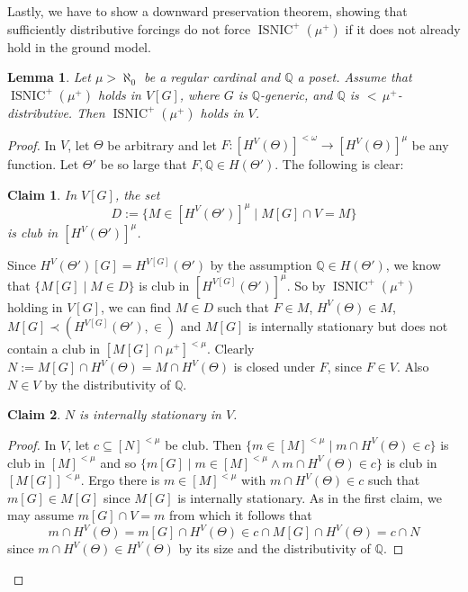 \documentclass[12pt]{amsart}
\theoremstyle{definition}
\theoremstyle{remark}
\theoremstyle{plain}
\newtheorem{mylem}[mydef]{Lemma}
\newtheorem{myclaim}{Claim}
\numberwithin{mydef}{section}
\DeclareMathOperator{\ISNIC}{ISNIC}
\newcommand{\dQ}{\mathbb{Q}}
\begin{document}
	Lastly, we have to show a downward preservation theorem, showing that sufficiently distributive forcings do not force $\ISNIC^+(\mu^+)$ if it does not already hold in the ground model.
	
	\begin{mylem}\label{PreserveDown}
		Let $\mu>\aleph_0$ be a regular cardinal and $\dQ$ a poset. Assume that $\ISNIC^+(\mu^+)$ holds in $V[G]$, where $G$ is $\dQ$-generic, and $\dQ$ is ${<}\,\mu^+$-distributive. Then $\ISNIC^+(\mu^+)$ holds in $V$.
	\end{mylem}
	
	\begin{proof}
		In $V$, let $\Theta$ be arbitrary and let $F\colon[H^V(\Theta)]^{<\omega}\to[H^V(\Theta)]^{\mu}$ be any function. Let $\Theta'$ be so large that $F,\dQ\in H(\Theta')$. The following is clear:
		\setcounter{myclaim}{0}
		\begin{myclaim}
			In $V[G]$, the set
			$$D:=\{M\in[H^V(\Theta')]^{\mu}\;|\;M[G]\cap V=M\}$$
			is club in $[H^V(\Theta')]^{\mu}$.
		\end{myclaim}
		
		Since $H^V(\Theta')[G]=H^{V[G]}(\Theta')$ by the assumption $\dQ\in H(\Theta')$, we know that $\{M[G]\;|\;M\in D\}$ is club in $[H^{V[G]}(\Theta')]^{\mu}$. So by $\ISNIC^+(\mu^+)$ holding in $V[G]$, we can find $M\in D$ such that $F\in M$, $H^V(\Theta)\in M$, $M[G]\prec(H^{V[G]}(\Theta'),\in)$ and $M[G]$ is internally stationary but does not contain a club in $[M[G]\cap\mu^+]^{<\mu}$. Clearly $N:=M[G]\cap H^V(\Theta)=M\cap H^V(\Theta)$ is closed under $F$, since $F\in V$. Also $N\in V$ by the distributivity of $\dQ$.
		
		\begin{myclaim}
			$N$ is internally stationary in $V$.
		\end{myclaim}
		
		\begin{proof}
			In $V$, let $c\subseteq[N]^{<\mu}$ be club. Then $\{m\in[M]^{<\mu}\;|\;m\cap H^V(\Theta)\in c\}$ is club in $[M]^{<\mu}$ and so $\{m[G]\;|\;m\in[M]^{<\mu}\wedge m\cap H^V(\Theta)\in c\}$ is club in $[M[G]]^{<\mu}$. Ergo there is $m\in[M]^{<\mu}$ with $m\cap H^V(\Theta)\in c$ such that $m[G]\in M[G]$ since $M[G]$ is internally stationary. As in the first claim, we may assume $m[G]\cap V=m$ from which it follows that
			$$m\cap H^V(\Theta)=m[G]\cap H^V(\Theta)\in c\cap M[G]\cap H^V(\Theta)=c\cap N$$
			since $m\cap H^V(\Theta)\in H^V(\Theta)$ by its size and the distributivity of $\dQ$.
		\end{proof}
		

\end{proof}
\end{document}
